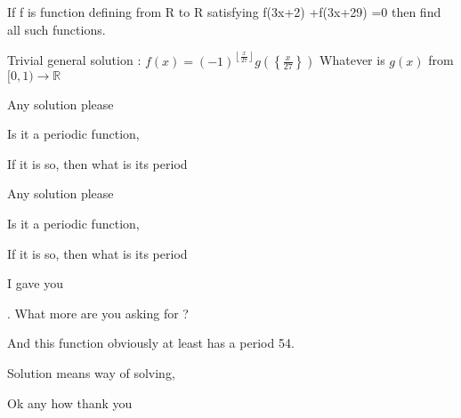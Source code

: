 \begin{solution}
	\begin{tcolorbox}\begin{bolded}\begin{italicized}If f is function defining from R to R satisfying f(3x+2) +f(3x+29) =0 then find all such functions.\end{italicized}\end{bolded}\end{tcolorbox}

Trivial general solution : $f(x)=(-1)^{\left\lfloor\frac x{27}\right\rfloor}g(\left\{\frac x{27}\right\})$
Whatever is $g(x)$ from $[0,1)\to\mathbb R$

\end{solution}



\begin{solution}
	Any solution please

Is it a periodic function,

If it is so, then what is its period

\end{solution}



\begin{solution}
	\begin{tcolorbox}Any solution please

Is it a periodic function,

If it is so, then what is its period\end{tcolorbox}
I gave you. What more are you asking for ?

And this function obviously at least has a period 54.

\end{solution}



\begin{solution}
	Solution means way of solving, 

Ok any how thank you
\end{solution}



